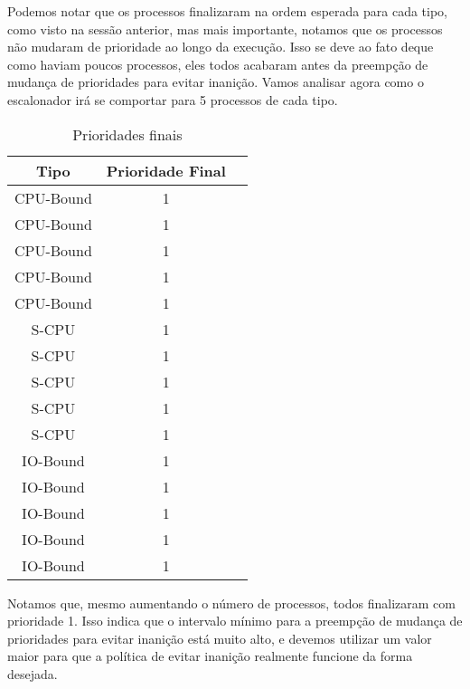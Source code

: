 \documentclass{article}
\begin{document}
Podemos notar que os processos finalizaram na ordem esperada para cada tipo,
como visto na sessão anterior, mas mais importante, notamos que os processos
não mudaram de prioridade ao longo da execução. Isso se deve ao fato deque como
haviam poucos processos, eles todos acabaram antes da preempção de mudança de
prioridades para evitar inanição. Vamos analisar agora como o escalonador irá
se comportar para 5 processos de cada tipo.

\begin{table}[H]
      \centering
      \begin{tabular}{|c|c|c|}
            \hline
            \textbf{Tipo} & \textbf{Prioridade Final} \\
            \hline
            CPU-Bound     & 1                         \\
            CPU-Bound     & 1                         \\
            CPU-Bound     & 1                         \\
            CPU-Bound     & 1                         \\
            CPU-Bound     & 1                         \\
            S-CPU         & 1                         \\
            S-CPU         & 1                         \\
            S-CPU         & 1                         \\
            S-CPU         & 1                         \\
            S-CPU         & 1                         \\
            IO-Bound      & 1                         \\
            IO-Bound      & 1                         \\
            IO-Bound      & 1                         \\
            IO-Bound      & 1                         \\
            IO-Bound      & 1                         \\
            \hline
      \end{tabular}
      \caption{Prioridades finais}
\end{table}

Notamos que, mesmo aumentando o número de processos, todos finalizaram com
prioridade 1. Isso indica que o intervalo mínimo para a preempção de mudança de
prioridades para evitar inanição está muito alto, e devemos utilizar um valor
maior para que a política de evitar inanição realmente funcione da forma
desejada.
\end{document}
